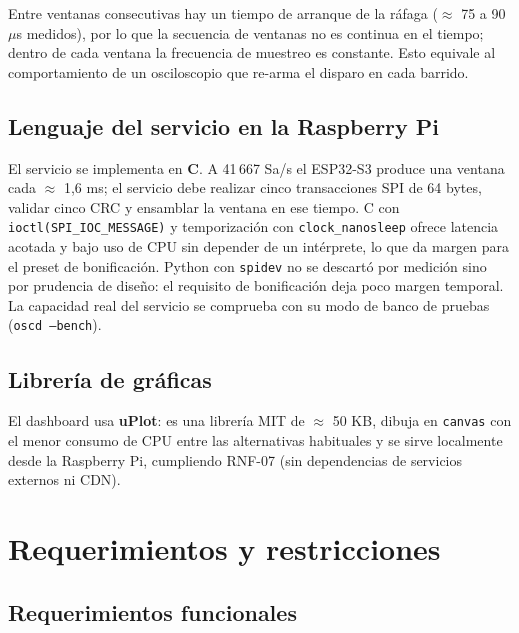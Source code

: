 \documentclass[12pt,a4paper]{article}
\begin{document}
Entre ventanas consecutivas hay un tiempo de arranque de la ráfaga ($\approx$ 75 a 90 $\mu$s medidos), por lo que la secuencia de ventanas no es continua en el tiempo; dentro de cada ventana la frecuencia de muestreo es constante. Esto equivale al comportamiento de un osciloscopio que re-arma el disparo en cada barrido.

\subsection{Lenguaje del servicio en la Raspberry Pi}

El servicio se implementa en \textbf{C}. A 41\,667 Sa/s el ESP32-S3 produce una ventana cada $\approx$ 1{,}6 ms; el servicio debe realizar cinco transacciones SPI de 64 bytes, validar cinco CRC y ensamblar la ventana en ese tiempo. C con \texttt{ioctl(SPI\_IOC\_MESSAGE)} y temporización con \texttt{clock\_nanosleep} ofrece latencia acotada y bajo uso de CPU sin depender de un intérprete, lo que da margen para el preset de bonificación. Python con \texttt{spidev} no se descartó por medición sino por prudencia de diseño: el requisito de bonificación deja poco margen temporal. La capacidad real del servicio se comprueba con su modo de banco de pruebas (\texttt{oscd --bench}).

\subsection{Librería de gráficas}

El dashboard usa \textbf{uPlot}: es una librería MIT de $\approx$ 50 KB, dibuja en \texttt{canvas} con el menor consumo de CPU entre las alternativas habituales y se sirve localmente desde la Raspberry Pi, cumpliendo RNF-07 (sin dependencias de servicios externos ni CDN).

\section{Requerimientos y restricciones}

\subsection{Requerimientos funcionales}
\end{document}
